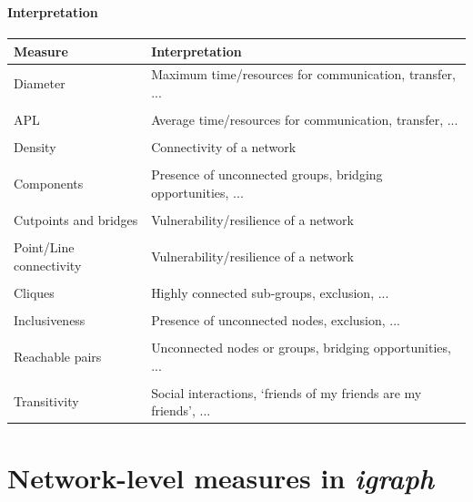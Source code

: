 \documentclass[8pt]{beamer}
\begin{document}
\begin{frame}
\frametitle{\insertsection}
\framesubtitle{Interpretation}

\footnotesize
\centering
\begin{tabular}{lp{7.5cm}}
\toprule
\textbf{Measure} & \textbf{Interpretation}\\
\hline
Diameter                        & Maximum time/resources for communication, transfer, ...\\
\\
APL                             & Average time/resources for communication, transfer, ...\\
\\
Density                         & Connectivity of a network \\
\\
Components                      & Presence of unconnected groups, bridging opportunities, ... \\
\\
Cutpoints and bridges           & Vulnerability/resilience of a network\\
\\
Point/Line connectivity         & Vulnerability/resilience of a network\\
\\
Cliques                         & Highly connected sub-groups, exclusion, ...\\
\\
Inclusiveness                   & Presence of unconnected nodes, exclusion, ... \\    
\\
Reachable pairs                 & Unconnected nodes or groups, bridging opportunities, ... \\
\\
Transitivity                    & Social interactions, `friends of my friends are my friends', ... \\

\bottomrule
\end{tabular}

\end{frame}




\section{Network-level measures in \textit{igraph}}
\end{document}
